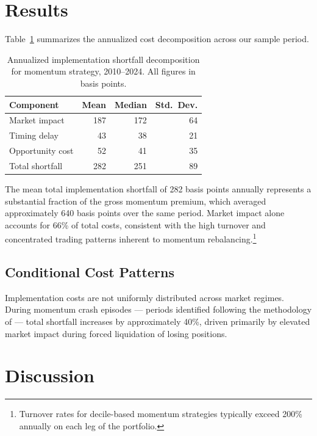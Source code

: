 \documentclass{cris}
\begin{document}
\section{Results}

Table~\ref{tab:costs} summarizes the annualized cost decomposition across our sample period.

\begin{table}[ht]
  \centering
  \caption{Annualized implementation shortfall decomposition for momentum strategy, 2010--2024. All figures in basis points.}
  \label{tab:costs}
  \begin{tabular}{lrrr}
    \toprule
    Component & Mean & Median & Std.~Dev. \\
    \midrule
    Market impact     & 187 & 172 & 64 \\
    Timing delay      &  43 &  38 & 21 \\
    Opportunity cost  &  52 &  41 & 35 \\
    \midrule
    Total shortfall   & 282 & 251 & 89 \\
    \bottomrule
  \end{tabular}
\end{table}

The mean total implementation shortfall of 282 basis points annually represents a substantial fraction of the gross momentum premium, which averaged approximately 640 basis points over the same period. Market impact alone accounts for 66\% of total costs, consistent with the high turnover and concentrated trading patterns inherent to momentum rebalancing.\footnote{Turnover rates for decile-based momentum strategies typically exceed 200\% annually on each leg of the portfolio.}

\subsection{Conditional Cost Patterns}

Implementation costs are not uniformly distributed across market regimes. During momentum crash episodes --- periods identified following the methodology of \citet{daniel2016} --- total shortfall increases by approximately 40\%, driven primarily by elevated market impact during forced liquidation of losing positions.

\section{Discussion}
\end{document}
